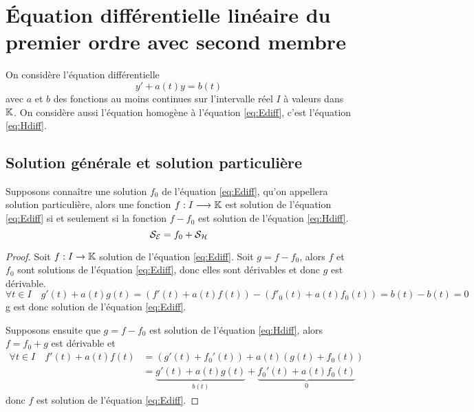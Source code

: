 \section{Équation différentielle linéaire du premier ordre avec second membre}
\label{sec:equadifflinpremierordresecondmembre}
On considère l'équation différentielle
\begin{equation}
y'+a(t)y=b(t) \label{eq:Ediff}
\end{equation}
avec \(a\) et \(b\) des fonctions au moins continues sur l'intervalle réel \(I\) à valeurs dans \(\mathbb{K}\).
On considère aussi l'équation homogène à l'équation \eqref{eq:Ediff}, c'est l'équation \eqref{eq:Hdiff}.
\subsection{Solution générale et solution particulière}
\label{subsec:solutiongeneraleetpart}
\begin{theo}\label{theo:3}
Supposons connaître une solution \(f_0\) de l'équation \eqref{eq:Ediff}, qu'on appellera solution particulière, alors une fonction \(f:I \longrightarrow \mathbb{K}\) est solution de l'équation \eqref{eq:Ediff} si et seulement si la fonction \(f-f_0\) est solution de l'équation \eqref{eq:Hdiff}.
\begin{equation}
\mathcal{S}_{\mathcal{E}}=f_0 + \mathcal{S}_{\mathcal{H}}
\end{equation}
\end{theo}
\begin{proof}
  Soit \(f:I \rightarrow \mathbb{K}\) solution de l'équation \eqref{eq:Ediff}. Soit \(g=f-f_0\), alors \(f\) et \(f_0\) sont solutions de l'équation \eqref{eq:Ediff}, donc elles sont dérivables et donc \(g\) est dérivable.
  \begin{equation}
    \forall t \in I \quad g'(t)+a(t)g(t)=(f'(t)+a(t)f(t))-(f'_0(t)+a(t)f_0(t))=b(t)-b(t)=0
  \end{equation}
g est donc solution de l'équation \eqref{eq:Ediff}.

Supposons ensuite que \(g=f-f_0\) est solution de l'équation \eqref{eq:Hdiff}, alors \(f=f_0+g\) est dérivable et
\begin{align}
  \forall t \in I \quad f'(t)+a(t)f(t)&=(g'(t)+f_0'(t)) + a(t)(g(t)+f_0(t)) \\ &=\underbrace{g'(t)+a(t)g(t)}_{b(t)} + \underbrace{f_0'(t)+a(t)f_0(t)}_{0}
\end{align}
donc \(f\) est solution de l'équation \eqref{eq:Ediff}.
\end{proof}

